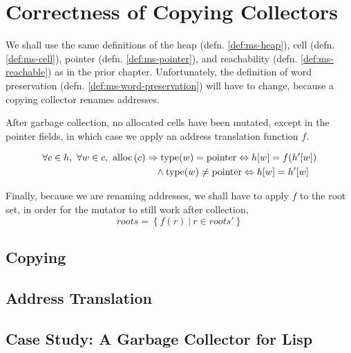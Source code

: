 \chapter{Correctness of Copying Collectors}
\label{sec:copying}

We shall use the same definitions of the \gls{heap}
(defn. \ref{def:ms-heap}), \gls{cell} (defn. \ref{def:ms-cell}),
\gls{pointer} (defn. \ref{def:ms-pointer}), and reachability
(defn. \ref{def:ms-reachable}) as in the prior chapter. Unfortunately,
the definition of word preservation
(defn. \ref{def:ms-word-preservation}) will have to change, because a
\gls{copying} \gls{collector} renames addresses.

\begin{definition}
  \label{def:c-word-preservation}
  After garbage collection, no allocated cells have been mutated,
  except in the pointer fields, in which case we apply an address
  translation function $f$.

  \begin{align*}
    \forall c \in h,\ \forall w \in c,\ \mathrm{alloc}\left(c\right) & \Rightarrow
    \mathrm{type}(w) = \mathrm{pointer} \Leftrightarrow h[w] = f(h'[w])\\
    &\quad\land \mathrm{type}(w) \neq \mathrm{pointer} \Leftrightarrow h[w] = h'[w]
  \end{align*}
\end{definition}

Finally, because we are renaming addresses, we shall have to apply $f$
to the root set, in order for the mutator to still work after
collection, \[roots = \left\{f(r)~|~r \in roots'\right\}\]

\section{Copying}
\label{sec:copying-copying}


\section{Address Translation}
\label{sec:copying-address}


\section{Case Study: A Garbage Collector for Lisp}
\label{sec:copying-example}


